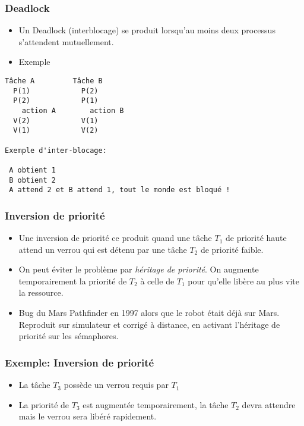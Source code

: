 \documentclass[ignorenonframetext,]{beamer}
\begin{document}
\begin{frame}[fragile]\frametitle{Deadlock}

\begin{itemize}
\item
  Un Deadlock (interblocage) se produit lorsqu'au moins deux processus
  s'attendent mutuellement.
\item
  Exemple
\end{itemize}

\begin{verbatim}
Tâche A         Tâche B 
  P(1)            P(2)   
  P(2)            P(1)
    action A        action B
  V(2)            V(1)
  V(1)            V(2)          

Exemple d'inter-blocage:

 A obtient 1
 B obtient 2
 A attend 2 et B attend 1, tout le monde est bloqué ! 
\end{verbatim}

\end{frame}

\begin{frame}\frametitle{Inversion de priorité}

\begin{itemize}
\item
  Une inversion de priorité ce produit quand une tâche $T_1$ de priorité
  haute attend un verrou qui est détenu par une tâche $T_2$ de priorité
  faible.
\item
  On peut éviter le problème par \emph{héritage de priorité}. On
  augmente temporairement la priorité de $T_2$ à celle de $T_1$ pour
  qu'elle libère au plus vite la ressource.
\item
  Bug du Mars Pathfinder en 1997 alors que le robot était déjà sur Mars.
  Reproduit sur simulateur et corrigé à distance, en activant l'héritage
  de priorité sur les sémaphores.
\end{itemize}

\end{frame}

\begin{frame}\frametitle{Exemple: Inversion de priorité}

\begin{itemize}
\item
  La tâche $T_3$ possède un verrou requis par $T_1$
\item
  La priorité de $T_3$ est augmentée temporairement, la tâche $T_2$
  devra attendre mais le verrou sera libéré rapidement.
\end{itemize}

\begin{RTGrid}[width=10cm]{3}{22}
\end{RTGrid}

\end{frame}
\end{document}
